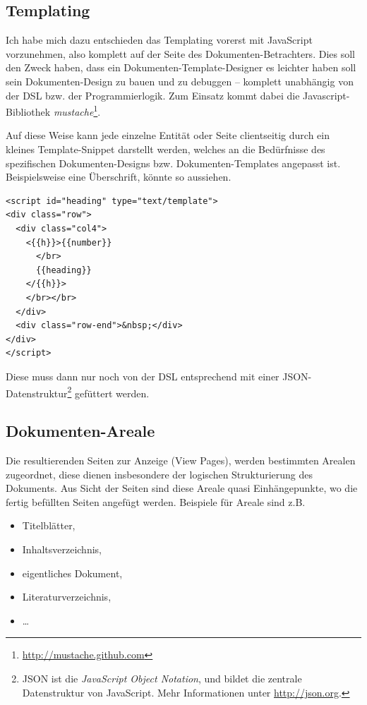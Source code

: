 \subsection{Templating}

Ich habe mich dazu entschieden das Templating vorerst mit JavaScript
vorzunehmen, also komplett auf der Seite des Dokumenten-Betrachters.
Dies soll den Zweck haben, dass ein Dokumenten-Template-Designer es
leichter haben soll sein Dokumenten-Design zu bauen und zu debuggen --
komplett unabhängig von der DSL bzw. der Programmierlogik.
Zum Einsatz kommt dabei die Javascript-Bibliothek
\emph{mustache}\footnote{\url{http://mustache.github.com}}.

Auf diese Weise kann jede einzelne Entität oder Seite clientseitig
durch ein kleines Template-Snippet darstellt werden, welches an die
Bedürfnisse des spezifischen Dokumenten-Designs bzw. Dokumenten-Templates
angepasst ist. Beispielsweise eine Überschrift, könnte so aussiehen.

\begin{verbatim}
<script id="heading" type="text/template">
<div class="row">
  <div class="col4">
    <{{h}}>{{number}}
      </br>
      {{heading}}
    </{{h}}>
    </br></br>
  </div>
  <div class="row-end">&nbsp;</div>
</div>
</script>
\end{verbatim}

Diese muss dann nur noch von der DSL entsprechend mit einer
JSON-Datenstruktur\footnote{JSON ist die \emph{JavaScript Object Notation},
und bildet die zentrale Datenstruktur von JavaScript.
Mehr Informationen unter \url{http://json.org}.} gefüttert werden.

\subsection{Dokumenten-Areale}

Die resultierenden Seiten zur Anzeige (View Pages), werden bestimmten
Arealen zugeordnet, diese dienen insbesondere der logischen Strukturierung
des Dokuments. Aus Sicht der Seiten sind diese Areale quasi
Einhängepunkte, wo die fertig befüllten Seiten angefügt werden.
Beispiele für Areale sind z.B.

\begin{itemize}
  \item Titelblätter,
  \item Inhaltsverzeichnis,
  \item eigentliches Dokument,
  \item Literaturverzeichnis,
  \item \ldots
\end{itemize}

